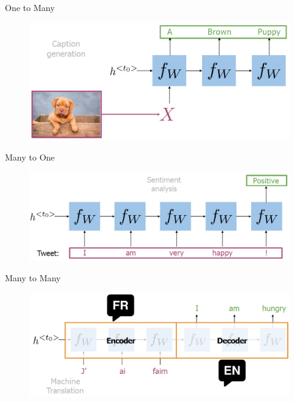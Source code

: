 \begin{frame}{One to Many}
    \begin{figure}
        \centering
        \includegraphics[width=\linewidth, height=0.9\textheight,keepaspectratio]{images/nlp/rnn-one2many.png}
    \end{figure}
\end{frame}

\begin{frame}{Many to One}
    \begin{figure}
        \centering
        \includegraphics[width=\linewidth, height=0.9\textheight,keepaspectratio]{images/nlp/rnn-many2one.png}
    \end{figure}
\end{frame}
\begin{frame}{Many to Many}
    \begin{figure}
        \centering
        \includegraphics[width=\linewidth, height=0.9\textheight,keepaspectratio]{images/nlp/rnn-many2many.png}
    \end{figure}
\end{frame}

